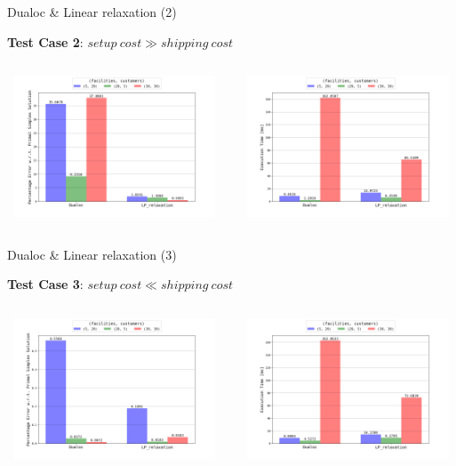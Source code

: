 \documentclass{beamer}
\begin{document}
	   \begin{frame}{Dualoc \& Linear relaxation (2)}
	    
        \textbf{Test Case 2}: $setup \ cost \gg shipping \ cost$
        
        \begin{columns}
	   \centering
        \includegraphics[width=6.5cm,height=4.2cm]{img/chart_error_1.png}
        
        \centering
        \includegraphics[width=6.5cm,height=4.2cm]{img/chart_time_1.png}
        \end{columns}
        
	    \end{frame}
	    
	    \begin{frame}{Dualoc \& Linear relaxation (3)}
	    
        \textbf{Test Case 3}: $setup \ cost \ll shipping \ cost$
        
        
        \begin{columns}
	   \centering
        \includegraphics[width=6.5cm,height=4.2cm]{img/chart_error_2.png}
        
        \centering
        \includegraphics[width=6.5cm,height=4.2cm]{img/chart_time_2.png}
        \end{columns}
        
	    \end{frame}
	    
\end{document}
